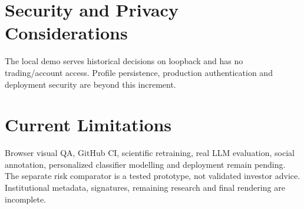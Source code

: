 \section{Security and Privacy Considerations}
The local demo serves historical decisions on loopback and has no trading/account access. Profile persistence, production authentication and deployment security are beyond this increment.
\section{Current Limitations}
Browser visual QA, GitHub CI, scientific retraining, real LLM evaluation, social annotation, personalized classifier modelling and deployment remain pending. The separate risk comparator is a tested prototype, not validated investor advice. Institutional metadata, signatures, remaining research and final rendering are incomplete.
